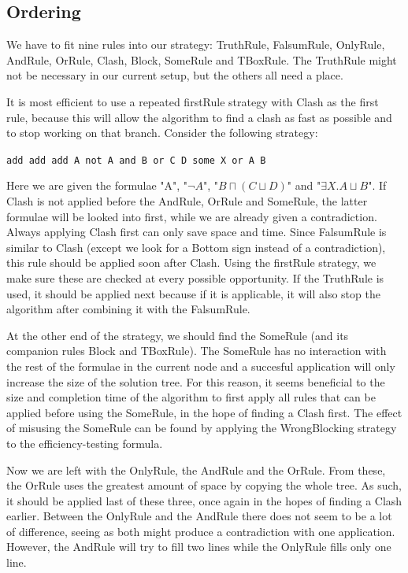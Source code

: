 \documentclass[11pt]{article} %
\begin{document}
\subsection{Ordering}
\label{sec:Ordering}

We have to fit nine rules into our strategy: TruthRule, FalsumRule, OnlyRule, AndRule, OrRule, Clash, Block, SomeRule and TBoxRule. The TruthRule might not be necessary in our current setup, but the others all need a place. 

It is most efficient to use a repeated firstRule strategy with Clash as the first rule, because this will allow the algorithm to find a clash as fast as possible and to stop working on that branch. Consider the following strategy: 

\begin{center}
\texttt{add add add A not A and B or C D some X or A B}
\end{center} 

Here we are given the formulae "A", "$\neg A$", "$B\sqcap (C \sqcup D)$" and "$\exists X. A \sqcup B$". If Clash is not applied before the AndRule, OrRule and SomeRule, the latter formulae will be looked into first, while we are already given a contradiction. Always applying Clash first can only save space and time. Since FalsumRule is similar to Clash (except we look for a Bottom sign instead of a contradiction), this rule should be applied soon after Clash. Using the firstRule strategy, we make sure these are checked at every possible opportunity.
If the TruthRule is used, it should be applied next because if it is applicable, it will also stop the algorithm after combining it with the FalsumRule.

At the other end of the strategy, we should find the SomeRule (and its companion rules Block and TBoxRule). The SomeRule has no interaction with the rest of the formulae in the current node and a succesful application will only increase the size of the solution tree. For this reason, it seems beneficial to the size and completion time of the algorithm to first apply all rules that can be applied before using the SomeRule, in the hope of finding a Clash first. The effect of misusing the SomeRule can be found by applying the WrongBlocking strategy to the efficiency-testing formula.

Now we are left with the OnlyRule, the AndRule and the OrRule. From these, the OrRule uses the greatest amount of space by copying the whole tree. As such, it should be applied last of these three, once again in the hopes of finding a Clash earlier. Between the OnlyRule and the AndRule there does not seem to be a lot of difference, seeing as both might produce a contradiction with one application. However, the AndRule will try to fill two lines while the OnlyRule fills only one line.
\end{document}
